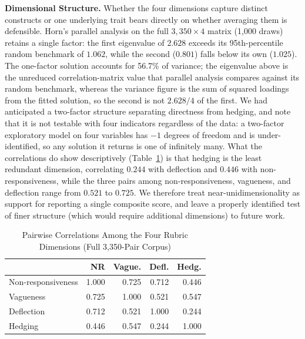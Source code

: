 \documentclass[conference]{IEEEtran}
\begin{document}
\textbf{Dimensional Structure.} Whether the four dimensions capture distinct constructs or one underlying trait bears directly on whether averaging them is defensible. Horn's parallel analysis on the full $3{,}350 \times 4$ matrix (1{,}000 draws) retains a single factor: the first eigenvalue of $2.628$ exceeds its 95th-percentile random benchmark of $1.062$, while the second ($0.801$) falls below its own ($1.025$). The one-factor solution accounts for 56.7\% of variance; the eigenvalue above is the unreduced correlation-matrix value that parallel analysis compares against its random benchmark, whereas the variance figure is the sum of squared loadings from the fitted solution, so the second is not $2.628/4$ of the first. We had anticipated a two-factor structure separating directness from hedging, and note that it is not testable with four indicators regardless of the data: a two-factor exploratory model on four variables has $-1$ degrees of freedom and is under-identified, so any solution it returns is one of infinitely many. What the correlations do show descriptively (Table~\ref{tab:dimcorr}) is that hedging is the least redundant dimension, correlating $0.244$ with deflection and $0.446$ with non-responsiveness, while the three pairs among non-responsiveness, vagueness, and deflection range from $0.521$ to $0.725$. We therefore treat near-unidimensionality as support for reporting a single composite score, and leave a properly identified test of finer structure (which would require additional dimensions) to future work.

\begin{table}[t]
\centering
\caption{Pairwise Correlations Among the Four Rubric Dimensions (Full 3,350-Pair Corpus)}
\label{tab:dimcorr}
\begin{tabular}{lrrrr}
\toprule
& NR & Vague. & Defl. & Hedg. \\
\midrule
Non-responsiveness & 1.000 & 0.725 & 0.712 & 0.446 \\
Vagueness           & 0.725 & 1.000 & 0.521 & 0.547 \\
Deflection           & 0.712 & 0.521 & 1.000 & 0.244 \\
Hedging              & 0.446 & 0.547 & 0.244 & 1.000 \\
\bottomrule
\end{tabular}
\end{table}
\end{document}
